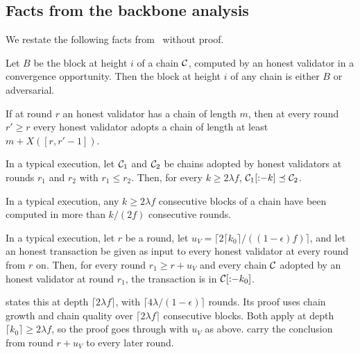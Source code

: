 \subsection{Facts from the backbone analysis}

We restate the following facts from~\cite{gkl24} without proof.

\begin{lemma}\label{lem.unique}
    Let $B$ be the block at height $i$ of a chain $\mathcal{C}$, computed by an honest
    validator in a convergence opportunity. Then the block at height $i$ of
    any chain is either $B$ or adversarial.
\end{lemma}

\begin{lemma}\label{lem.growth}
    If at round $r$ an honest validator has a chain of length $m$, then at
    every round $r'\ge r$ every honest validator adopts a chain of length at
    least $m+X([r,r'-1])$.
\end{lemma}

\begin{lemma}\label{lem.commonprefix}
    In a typical execution, let $\mathcal{C}_1$ and $\mathcal{C}_2$ be chains adopted by honest
    validators at rounds $r_1$ and $r_2$ with $r_1\le r_2$. Then, for every
    $k\ge2\lambda f$, $\mathcal{C}_1[{:}{-}k]\preceq\mathcal{C}_2$.
\end{lemma}

\begin{lemma}\label{lem.span}
    In a typical execution, any $k\ge2\lambda f$ consecutive blocks of a chain
    have been computed in more than $k/(2f)$ consecutive rounds.
\end{lemma}

\begin{lemma}\label{lem.gklliveness}
    In a typical execution, let $r$ be a round, let
    $u_V=\lceil2\lceil k_0\rceil/((1-\epsilon)f)\rceil$, and let an honest
    transaction be given as input to every honest validator at every round from
    $r$ on. Then, for every round $r_1\ge r+u_V$ and every chain $\mathcal{C}$ adopted
    by an honest validator at round $r_1$, the transaction is in
    $\mathcal{C}[{:}{-}k_0]$.
\end{lemma}

\cite[Lemma~6.3]{gkl24} states this at depth $\lceil2\lambda f\rceil$, with
$\lceil4\lambda/(1-\epsilon)\rceil$ rounds. Its proof uses chain growth and
chain quality over $\lceil2\lambda f\rceil$ consecutive blocks. Both apply at
depth $\lceil k_0\rceil\ge2\lambda f$, so the proof goes through with $u_V$ as
above.  carry the conclusion from round
$r+u_V$ to every later round.


